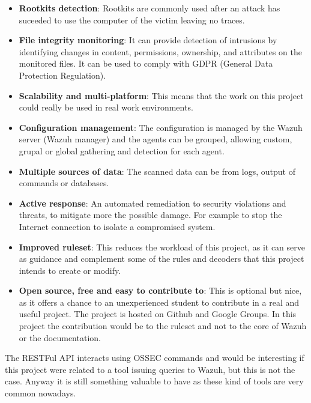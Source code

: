 \begin{itemize}
	\item \textbf{Rootkits detection}: Rootkits are commonly used after an attack has suceeded to use the computer of the victim leaving no traces.
	\item \textbf{File integrity monitoring}: It can provide detection of intrusions by identifying changes in content, permissions, ownership, and attributes on the monitored files. It can be used to comply with GDPR (General Data Protection Regulation).
	\item \textbf{Scalability and multi-platform}: This means that the work on this project could really be used in real work environments.
	\item \textbf{Configuration management}: The configuration is managed by the Wazuh server (Wazuh manager) and the agents can be grouped, allowing custom, grupal or global gathering and detection for each agent.
	\item \textbf{Multiple sources of data}: The scanned data can be from logs, output of commands or databases. %
	\item \textbf{Active response}: An automated remediation to security violations and threats, to mitigate more the possible damage. For example to stop the Internet connection to isolate a compromised system.
	\item \textbf{Improved ruleset}: This reduces the workload of this project, as it can serve as guidance and complement some of the rules and decoders that this project intends to create or modify.
	\item \textbf{Open source, free and easy to contribute to}: This is optional but nice, as it offers a chance to an unexperienced student to contribute in a real and useful project. The project is hosted on Github and Google Groups. In this project the contribution would be to the ruleset\cite{wazuh_ruleset} and not to the core of Wazuh\cite{wazuh} or the documentation\cite{wazuh_documentation2}.
\end{itemize}
\linej
The RESTFul API interacts using OSSEC commands and would be interesting if this project were related to a tool issuing queries to Wazuh, but this is not the case. Anyway it is still something valuable to have as these kind of tools are very common nowadays.

